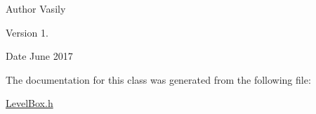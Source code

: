 \begin{DoxyAuthor}{Author}
Vasily 
\end{DoxyAuthor}
\begin{DoxyVersion}{Version}
1. 
\end{DoxyVersion}
\begin{DoxyDate}{Date}
June 2017 
\end{DoxyDate}


The documentation for this class was generated from the following file\+:\begin{DoxyCompactItemize}
\item 
\hyperlink{_level_box_8h}{Level\+Box.\+h}\end{DoxyCompactItemize}
